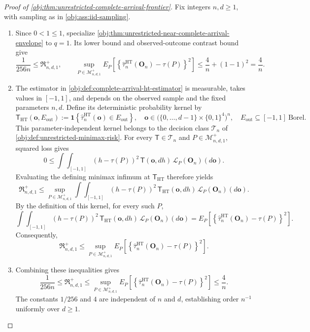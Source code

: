 \documentclass[11pt]{article}
\begin{document}
\begin{proof}[Proof of \cref{obj:thm:unrestricted-complete-arrival-frontier}]
Fix integers \(n,d\ge1\), with sampling as in \cref{obj:ass:iid-sampling}.

\begin{enumerate}
\item Since \(0<1\le1\), specialize \cref{obj:thm:unrestricted-near-complete-arrival-envelope} to \(q=1\). Its lower bound and observed-outcome contrast bound give
\[
\frac{1}{256n}\le \mathfrak R^{+}_{n,d,1},
\qquad
\sup_{P\in\mathcal M^{+}_{n,d,1}}
E_P\!\left[
\left\{\widehat\tau^{\mathrm{HT}}_n(\mathbf O_n)-\tau(P)\right\}^{2}
\right]
\le \frac4n+(1-1)^2=\frac4n.
\]

\item The estimator in \cref{obj:def:complete-arrival-ht-estimator} is measurable, takes values in \([-1,1]\), and depends on the observed sample and the fixed parameters \(n,d\). Define its deterministic probability kernel by
\[
\mathsf T_{\mathrm{HT}}(\mathbf o,E_{\mathrm{out}})
:=
\mathbf 1\!\left\{
\widehat\tau^{\mathrm{HT}}_n(\mathbf o)\in E_{\mathrm{out}}
\right\},
\quad
\mathbf o\in
\bigl(\{0,\ldots,d-1\}\times\{0,1\}^{4}\bigr)^n,
\quad
E_{\mathrm{out}}\subseteq[-1,1]\ \text{Borel}.
\]
This parameter-independent kernel belongs to the decision class \(\mathcal T_n\) of \cref{obj:def:unrestricted-minimax-risk}. For every \(\mathsf T\in\mathcal T_n\) and \(P\in\mathcal M^{+}_{n,d,1}\), squared loss gives
\[
0\le
\int\!\int_{[-1,1]}
(h-\tau(P))^2\,
\mathsf T(\mathbf o,dh)\,
\mathcal L_P(\mathbf O_n)(d\mathbf o).
\]
Evaluating the defining minimax infimum at \(\mathsf T_{\mathrm{HT}}\) therefore yields
\[
\mathfrak R^{+}_{n,d,1}
\le
\sup_{P\in\mathcal M^{+}_{n,d,1}}
\int\!\int_{[-1,1]}
(h-\tau(P))^2\,
\mathsf T_{\mathrm{HT}}(\mathbf o,dh)\,
\mathcal L_P(\mathbf O_n)(d\mathbf o).
\]
By the definition of this kernel, for every such \(P\),
\[
\int\!\int_{[-1,1]}
(h-\tau(P))^2\,
\mathsf T_{\mathrm{HT}}(\mathbf o,dh)\,
\mathcal L_P(\mathbf O_n)(d\mathbf o)
=
E_P\!\left[
\left\{\widehat\tau^{\mathrm{HT}}_n(\mathbf O_n)-\tau(P)\right\}^{2}
\right].
\]
Consequently,
\[
\mathfrak R^{+}_{n,d,1}
\le
\sup_{P\in\mathcal M^{+}_{n,d,1}}
E_P\!\left[
\left\{\widehat\tau^{\mathrm{HT}}_n(\mathbf O_n)-\tau(P)\right\}^{2}
\right].
\]

\item Combining these inequalities gives
\[
\frac{1}{256n}
\le \mathfrak R^{+}_{n,d,1}
\le
\sup_{P\in\mathcal M^{+}_{n,d,1}}
E_P\!\left[
\left\{\widehat\tau^{\mathrm{HT}}_n(\mathbf O_n)-\tau(P)\right\}^{2}
\right]
\le \frac4n.
\]
The constants \(1/256\) and \(4\) are independent of \(n\) and \(d\), establishing order \(n^{-1}\) uniformly over \(d\ge1\).
\end{enumerate}
\end{proof}
\end{document}
